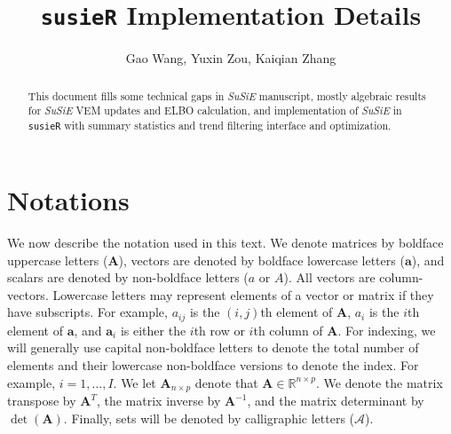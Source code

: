 \documentclass[11pt,authoryear]{article}
\numberwithin{equation}{section}
\theoremstyle{plain}
\newcommand{\susie}{\textsl{SuSiE}\xspace}
\begin{document}
\singlespacing
\title{\texttt{susieR} Implementation Details}
\author{Gao Wang, Yuxin Zou, Kaiqian Zhang}
\maketitle

\begin{abstract}
This document fills some technical gaps in \susie manuscript, mostly algebraic results for \susie VEM updates and ELBO calculation, and implementation of \susie in \texttt{susieR} with summary statistics and trend filtering interface and optimization.
\end{abstract}

\section{Notations}

We now describe the notation used in this text. We denote matrices by
boldface uppercase letters ($\mathbf{A}$), vectors are denoted by boldface
lowercase letters ($\mathbf{a}$), and scalars are denoted by non-boldface
letters ($a$ or $A$). All vectors are column-vectors. Lowercase
letters may represent elements of a vector or matrix if they have
subscripts. For example, $a_{ij}$ is the $(i,j)$th element of
$\mathbf{A}$, $a_i$ is the $i$th element of $\mathbf{a}$, and $\mathbf{a}_{i}$ is
either the $i$th row or $i$th column of $\mathbf{A}$. For indexing, we
will generally use capital non-boldface letters to denote the total
number of elements and their lowercase non-boldface versions to denote
the index. For example, $i = 1,\ldots,I$. We let $\mathbf{A}_{n \times p}$
denote that $\mathbf{A} \in \mathbb{R}^{n \times p}$. We denote the matrix
transpose by $\mathbf{A}^T$, the matrix inverse by $\mathbf{A}^{-1}$,
and the matrix determinant by $\det(\mathbf{A})$. Finally, sets will be
denoted by calligraphic letters ($\mathcal{A}$).



\end{document}
